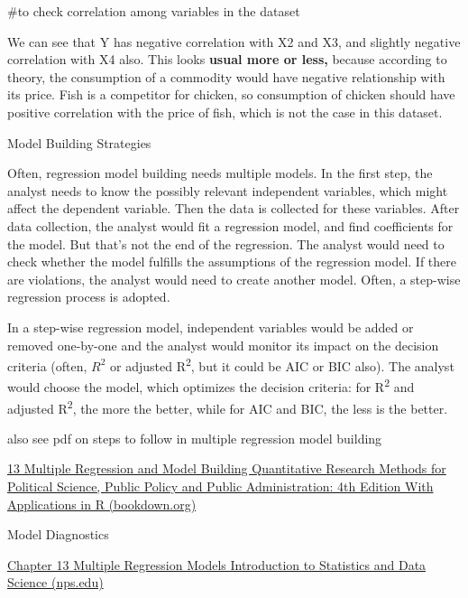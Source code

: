 \documentclass[
  letterpaper,
  paper =a4,
  twoside,
  openright,
  headsepline,
  footsepline,
  listof = totocnumbered,
  chapterprefix = true,
  firstiscover]{scrbook}
\newenvironment{Shaded}{\begin{snugshade}}{\end{snugshade}}
\newcommand{\CommentTok}[1]{\textcolor[rgb]{0.37,0.37,0.37}{#1}}
\begin{document}
\begin{Shaded}
\begin{Highlighting}[numbers=left,,]
\CommentTok{\#to check correlation among variables in the dataset}
\end{Highlighting}
\end{Shaded}

We can see that Y has negative correlation with X2 and X3, and slightly
negative correlation with X4 also. This looks \textbf{usual more or
less,} because according to theory, the consumption of a commodity would
have negative relationship with its price. Fish is a competitor for
chicken, so consumption of chicken should have positive correlation with
the price of fish, which is not the case in this dataset.

Model Building Strategies

Often, regression model building needs multiple models. In the first
step, the analyst needs to know the possibly relevant independent
variables, which might affect the dependent variable. Then the data is
collected for these variables. After data collection, the analyst would
fit a regression model, and find coefficients for the model. But that's
not the end of the regression. The analyst would need to check whether
the model fulfills the assumptions of the regression model. If there are
violations, the analyst would need to create another model. Often, a
step-wise regression process is adopted.

In a step-wise regression model, independent variables would be added or
removed one-by-one and the analyst would monitor its impact on the
decision criteria (often, \(R^2\) or adjusted R\textsuperscript{2}, but
it could be AIC or BIC also). The analyst would choose the model, which
optimizes the decision criteria: for R\textsuperscript{2} and adjusted
R\textsuperscript{2}, the more the better, while for AIC and BIC, the
less is the better.

also see pdf on steps to follow in multiple regression model building

\href{https://bookdown.org/ripberjt/qrmbook/multiple-regression-and-model-building.html}{13
Multiple Regression and Model Building \textbar{} Quantitative Research
Methods for Political Science, Public Policy and Public Administration:
4th Edition With Applications in R (bookdown.org)}

Model Diagnostics

\href{https://faculty.nps.edu/rbassett/_book/multiple-regression-models.html}{Chapter
13 Multiple Regression Models \textbar{} Introduction to Statistics and
Data Science (nps.edu)}
\end{document}

